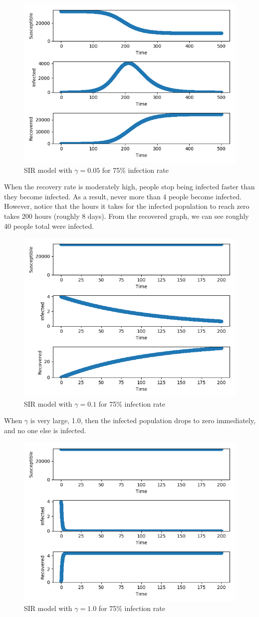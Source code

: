\documentclass[12pt]{article}
\begin{document}
\begin{figure}[H]
    \centering
    \includegraphics[width=0.6\linewidth]{g0p05.png}
    \caption{SIR model with $\gamma = 0.05$ for 75\% infection rate}
\end{figure}

When the recovery rate is moderately high, people stop being infected faster than they become infected. As a result, never more than 4 people become infected. However, notice that the hours it takes for the infected population to reach zero takes 200 hours (roughly 8 days). From the recovered graph, we can see roughly 40 people total were infected.

\begin{figure}[H]
    \centering
    \includegraphics[width=0.6\linewidth]{g0p1.png}
    \caption{SIR model with $\gamma = 0.1$ for 75\% infection rate}
\end{figure}

When $\gamma$ is very large, 1.0, then the infected population drops to zero immediately, and no one else is infected. 

\begin{figure}[H]
    \centering
    \includegraphics[width=0.6\linewidth]{g1p0.png}
    \caption{SIR model with $\gamma = 1.0$ for 75\% infection rate}
\end{figure}
\end{document}
